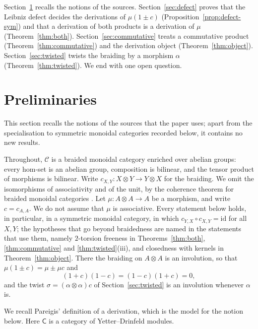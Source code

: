 \documentclass[]{interact}
\theoremstyle{plain}
\theoremstyle{definition}
\theoremstyle{remark}
\newcommand{\id}{\mathrm{id}}
\begin{document}
Section~\ref{sec:prelim} recalls the notions of the sources.
Section~\ref{sec:defect} proves that the Leibniz defect decides the derivations of $\mu(1 \pm c)$ (Proposition~\ref{prop:defect-sym}) and that a derivation of both products is a derivation of $\mu$ (Theorem~\ref{thm:both}).
Section~\ref{sec:commutative} treats a commutative product (Theorem~\ref{thm:commutative}) and the derivation object (Theorem~\ref{thm:object}).
Section~\ref{sec:twisted} twists the braiding by a morphism $\alpha$ (Theorem~\ref{thm:twisted}).
We end with one open question.

\section{Preliminaries}\label{sec:prelim}
This section recalls the notions of the sources that the paper uses; apart from the specialisation to symmetric monoidal categories recorded below, it contains no new results.

Throughout, $\mathcal{C}$ is a braided monoidal category enriched over abelian groups: every hom-set is an abelian group, composition is bilinear, and the tensor product of morphisms is bilinear.
Write $c_{X,Y} \colon X \otimes Y \to Y \otimes X$ for the braiding. %
We omit the isomorphisms of associativity and of the unit, by the coherence theorem for braided monoidal categories \citep[Theorem 2.5]{JoyalStreet1993}.
Let $\mu \colon A \otimes A \to A$ be a morphism, and write $c = c_{A,A}$.
We do not assume that $\mu$ is associative.
Every statement below holds, in particular, in a symmetric monoidal category, in which $c_{Y,X} \circ c_{X,Y} = \id$ for all $X, Y$; the hypotheses that go beyond braidedness are named in the statements that use them, namely $2$-torsion freeness in Theorems~\ref{thm:both}, \ref{thm:commutative} and \ref{thm:twisted}(iii), and closedness with kernels in Theorem~\ref{thm:object}.
There the braiding on $A \otimes A$ is an involution, so that $\mu(1 \pm c) = \mu \pm \mu c$ and
\[
(1 + c)(1 - c) = (1 - c)(1 + c) = 0,
\]
and the twist $\sigma = (\alpha \otimes \alpha)c$ of Section~\ref{sec:twisted} is an involution whenever $\alpha$ is.

We recall Pareigis' definition of a derivation, which is the model for the notion below. Here $\mathsf{C}$ is a category of Yetter--Drinfeld modules.
\end{document}
